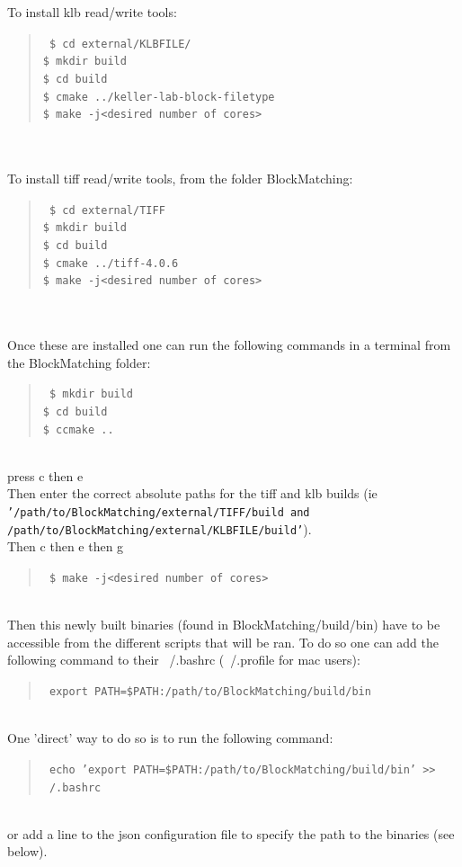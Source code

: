 \documentclass[10pt,a4paper]{article}
\newcommand{\option}[1]{{\texttt{'#1'}}}
\newenvironment{code}[1]{\mbox{}\\[1ex]\hspace*{-#1cm}\begin{minipage}{150mm}\begin{quote}\tt}{\end{quote}\end{minipage}\mbox{}\\[1ex]}
\begin{document}
To install klb read/write tools:
\begin{code}{0.8}
\$ cd external/KLBFILE/ \\
\$ mkdir build \\
\$ cd build \\
\$ cmake ../keller-lab-block-filetype \\
\$ make -j<desired number of cores> \\
\end{code}
\\
To install tiff read/write tools, from the folder BlockMatching:
\begin{code}{0.8}
\$ cd external/TIFF \\
\$ mkdir build \\
\$ cd build \\
\$ cmake ../tiff-4.0.6 \\
\$ make -j<desired number of cores> \\
\end{code}
\\
Once these are installed one can run the following commands in a terminal from the BlockMatching folder:
\begin{code}{0.8}
\$ mkdir build \\
\$ cd build \\
\$ ccmake .. \\
\end{code}
press c then e\\
Then enter the correct absolute paths for the tiff and klb builds (ie \option{/path/to/BlockMatching/external/TIFF/build and /path/to/BlockMatching/external/KLBFILE/build}).\\
Then c then e then g
\begin{code}{0.8}
\$ make -j<desired number of cores> \\
\end{code}
Then this newly built binaries (found in BlockMatching/build/bin) have to be accessible from the different scripts that will be ran. To do so one can add the following command to their ~/.bashrc (~/.profile for mac users):
\begin{code}{0.8}
export PATH=\$PATH:/path/to/BlockMatching/build/bin
\end{code}
One 'direct' way to do so is to run the following command:
\begin{code}{0.8}
echo 'export PATH=\$PATH:/path/to/BlockMatching/build/bin' >> ~/.bashrc
\end{code}
or add a line to the json configuration file to specify the path to the binaries (see below).\\
\end{document}
